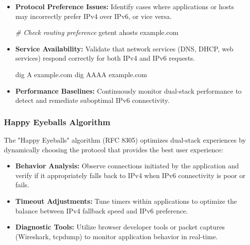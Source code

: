 \documentclass[
]{article}
\newenvironment{Shaded}{}{}
\newcommand{\CommentTok}[1]{\textcolor[rgb]{0.38,0.63,0.69}{\textit{#1}}}
\newcommand{\ExtensionTok}[1]{#1}
\newcommand{\FunctionTok}[1]{\textcolor[rgb]{0.02,0.16,0.49}{#1}}
\newcommand{\NormalTok}[1]{#1}
\providecommand{\tightlist}{%
  \setlength{\itemsep}{0pt}\setlength{\parskip}{0pt}}
\begin{document}
\begin{itemize}
\item
  \textbf{Protocol Preference Issues:} Identify cases where applications
  or hosts may incorrectly prefer IPv4 over IPv6, or vice versa.

\begin{Shaded}
\begin{Highlighting}[]
\CommentTok{\# Check routing preference}
\FunctionTok{getent}\NormalTok{ ahosts example.com}
\end{Highlighting}
\end{Shaded}
\item
  \textbf{Service Availability:} Validate that network services (DNS,
  DHCP, web services) respond correctly for both IPv4 and IPv6 requests.

\begin{Shaded}
\begin{Highlighting}[]
\ExtensionTok{dig}\NormalTok{ A example.com}
\ExtensionTok{dig}\NormalTok{ AAAA example.com}
\end{Highlighting}
\end{Shaded}
\item
  \textbf{Performance Baselines:} Continuously monitor dual-stack
  performance to detect and remediate suboptimal IPv6 connectivity.
\end{itemize}

\subsubsection{Happy Eyeballs
Algorithm}\label{happy-eyeballs-algorithm-1}

The "Happy Eyeballs" algorithm (RFC 8305) optimizes dual-stack
experiences by dynamically choosing the protocol that provides the best
user experience:

\begin{itemize}
\tightlist
\item
  \textbf{Behavior Analysis:} Observe connections initiated by the
  application and verify if it appropriately falls back to IPv4 when
  IPv6 connectivity is poor or fails.
\item
  \textbf{Timeout Adjustments:} Tune timers within applications to
  optimize the balance between IPv4 fallback speed and IPv6 preference.
\item
  \textbf{Diagnostic Tools:} Utilize browser developer tools or packet
  captures (Wireshark, tcpdump) to monitor application behavior in
  real-time.
\end{itemize}
\end{document}
